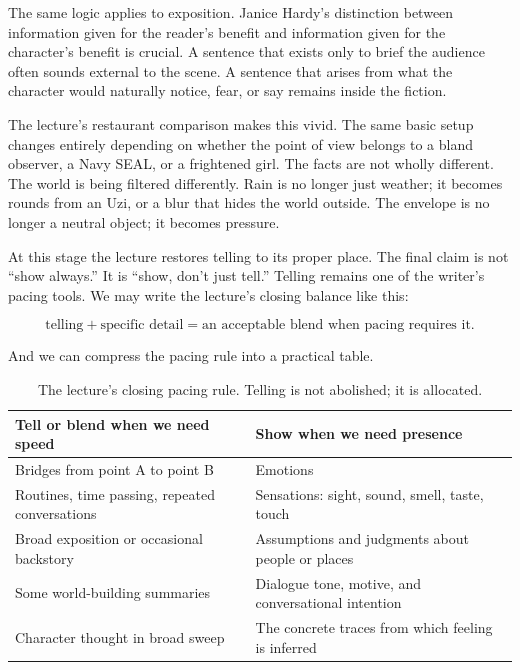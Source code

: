 The same logic applies to exposition. Janice Hardy's distinction between information given for the reader's benefit and information given for the character's benefit is crucial. A sentence that exists only to brief the audience often sounds external to the scene. A sentence that arises from what the character would naturally notice, fear, or say remains inside the fiction.

The lecture's restaurant comparison makes this vivid. The same basic setup changes entirely depending on whether the point of view belongs to a bland observer, a Navy SEAL, or a frightened girl. The facts are not wholly different. The world is being filtered differently. Rain is no longer just weather; it becomes rounds from an Uzi, or a blur that hides the world outside. The envelope is no longer a neutral object; it becomes pressure.

At this stage the lecture restores telling to its proper place. The final claim is not ``show always.'' It is ``show, don't just tell.'' Telling remains one of the writer's pacing tools. We may write the lecture's closing balance like this:

\begin{equation}
\text{telling} + \text{specific detail} = \text{an acceptable blend when pacing requires it}.
\end{equation}

And we can compress the pacing rule into a practical table.

\begin{table}[h]
\centering
\begin{tabular}{|p{}|p{}|}
\hline
\textbf{Tell or blend when we need speed} & \textbf{Show when we need presence} \\
\hline
Bridges from point A to point B & Emotions \\
\hline
Routines, time passing, repeated conversations & Sensations: sight, sound, smell, taste, touch \\
\hline
Broad exposition or occasional backstory & Assumptions and judgments about people or places \\
\hline
Some world-building summaries & Dialogue tone, motive, and conversational intention \\
\hline
Character thought in broad sweep & The concrete traces from which feeling is inferred \\
\hline
\end{tabular}
\caption{The lecture's closing pacing rule. Telling is not abolished; it is allocated.}
\end{table}

